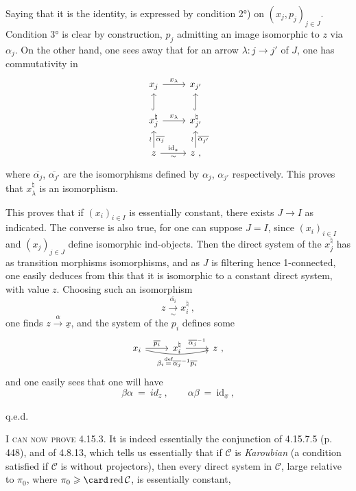 
Saying that it is the identity, is expressed by condition 2°) on $(x_j,p_j)_{j\in J}$. Condition 3° is clear by construction, $p_j$ admitting an image isomorphic to $z$ via $\alpha_j$. On the other hand, one sees away that for an arrow $\lambda : j \longrightarrow j'$ of $J$, one has commutativity in %
\[
\begin{tikzcd}
x_j \arrow[r, "x_\lambda"] & x_{j'} \\
x_j^\natural \arrow[u, hook] \arrow[r, "x_\lambda"] & x_{j'}^\natural \arrow[u, hook] \\
z \arrow[u, "\wr", "\overline{\alpha_j}"'] \arrow[r, "\mathrm{id}_z", "\sim"'] & z \ , \arrow[u, "\wr", "\overline{\alpha_{j'}}"']
\end{tikzcd}
\]
where $\overline{\alpha_j}$, $\overline{\alpha_{j'}}$ are the isomorphisms defined by $\alpha_j$, $\alpha_{j'}$ respectively. This proves that $x_\lambda^\natural$ is an isomorphism.

This proves that if $(x_i)_{i\in I}$ is essentially constant, there exists $J\longrightarrow I$ as indicated. The converse is also true, for one can suppose $J = I$, since $(x_i)_{i\in I}$ and $(x_j)_{j\in J}$ define isomorphic ind-objects. Then the direct system of the $x_j^\natural$ has as transition morphisms isomorphisms, and as $J$ is filtering hence 1-connected, one easily deduces from this that it is isomorphic
to a constant direct system, with value $z$. Choosing such an isomorphism
\[
z \xrightarrow[\sim]{\overline{\alpha_i}} x_i^\natural \ ,
\]
one finds $z \xrightarrow{\alpha} \underline{x}$, and the system of the $p_i$ defines some
\[
\begin{tikzcd}
x_i \arrow[r, "\overline{p_i}"] \arrow[rr, bend right=12, "\beta_i \overset{\text{def}}{=} \overline{\alpha_j}^{-1}\overline{p_i}"'] & x_i^\natural \arrow[r, "\overline{\alpha_j}^{-1}"] & z \ ,
\end{tikzcd}
\] %
and one easily sees that one will have
\[
\beta\alpha \ = \ id_z \ , \qquad \alpha\beta \ = \ \mathrm{id}_{\underline{x}} \ ,
\]

\hfill q.e.d.

\textsc{I can now prove} 4.15.3. It is indeed essentially the conjunction of 4.15.7.5 (p. 448), and of 4.8.13, which tells us essentially that if $\mathcal{C}$ is \textit{Karoubian} (a condition satisfied if $\mathcal{C}$ is without projectors), then every direct system in $\mathcal{C}$, large relative to $\pi_0$, where $\pi_0 \geqslant \card\,\text{red}\,\mathcal{C}$, is essentially constant,

